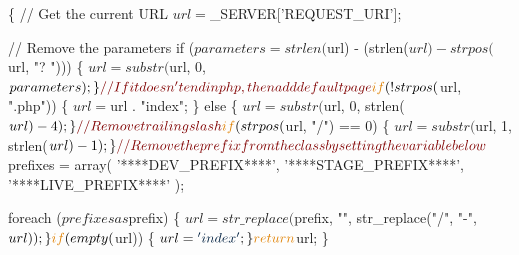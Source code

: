 \begin{DoxyCode}
                                       \{
               \textcolor{comment}{// Get the current URL}
               $url = $\_SERVER[\textcolor{stringliteral}{'REQUEST\_URI'}];

               \textcolor{comment}{// Remove the parameters}
               \textcolor{keywordflow}{if} ($parameters = strlen($url) - (strlen($url) - strpos($url, \textcolor{stringliteral}{"?
      "}))) \{
                              $url = substr($url, 0, $parameters);
               \}

               \textcolor{comment}{// If it doesn't end in php, then add default page}
               \textcolor{keywordflow}{if} (!strpos($url, \textcolor{stringliteral}{".php"})) \{
                              $url = $url . \textcolor{stringliteral}{"index"};
               \} \textcolor{keywordflow}{else} \{
                              $url = substr($url, 0, strlen($url) - 4);
               \}

               \textcolor{comment}{// Remove trailing slash}
               \textcolor{keywordflow}{if} (strpos($url, \textcolor{stringliteral}{"/"}) == 0) \{
                              $url = substr($url, 1, strlen($url) - 1);
               \}

               \textcolor{comment}{// Remove the prefix from the class by setting the variable
       below}
               $prefixes = array(
                              \textcolor{stringliteral}{'****DEV\_PREFIX****'},
                              \textcolor{stringliteral}{'****STAGE\_PREFIX****'},
                              \textcolor{stringliteral}{'****LIVE\_PREFIX****'}
               );
               
               \textcolor{keywordflow}{foreach} ($prefixes as $prefix) \{
                              $url = str\_replace($prefix, \textcolor{stringliteral}{""}, str\_replace(\textcolor{stringliteral}{"/"}, \textcolor{stringliteral}{
      "-"}, $url));
               \}

               \textcolor{keywordflow}{if} (empty($url)) \{
                              $url = \textcolor{stringliteral}{'index'};
               \}

               \textcolor{keywordflow}{return} $url;
\}
\end{DoxyCode}
